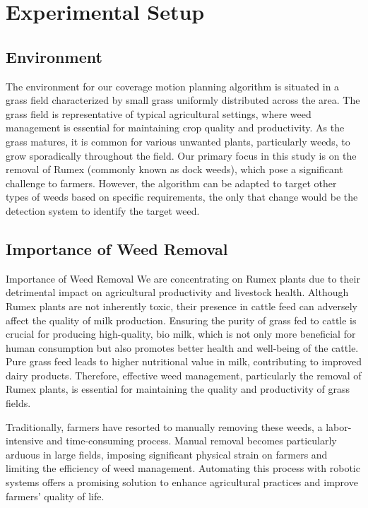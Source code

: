 \section{Experimental Setup}

\subsection{Environment}
The environment for our coverage motion planning algorithm is situated in a grass field characterized by small grass uniformly distributed across the area. The grass field is representative of typical agricultural settings, where weed management is essential for maintaining crop quality and productivity. As the grass matures, it is common for various unwanted plants, particularly weeds, to grow sporadically throughout the field. Our primary focus in this study is on the removal of Rumex (commonly known as dock weeds), which pose a significant challenge to farmers. However, the algorithm can be adapted to target other types of weeds based on specific requirements, the only that change would be the detection system to identify the target weed.

\subsection{Importance of Weed Removal}
Importance of Weed Removal
We are concentrating on Rumex plants due to their detrimental impact on agricultural productivity and livestock health. Although Rumex plants are not inherently toxic, their presence in cattle feed can adversely affect the quality of milk production. Ensuring the purity of grass fed to cattle is crucial for producing high-quality, bio milk, which is not only more beneficial for human consumption but also promotes better health and well-being of the cattle. Pure grass feed leads to higher nutritional value in milk, contributing to improved dairy products. Therefore, effective weed management, particularly the removal of Rumex plants, is essential for maintaining the quality and productivity of grass fields.


\vspace*{6mm}


Traditionally, farmers have resorted to manually removing these weeds, a labor-intensive and time-consuming process. Manual removal becomes particularly arduous in large fields, imposing significant physical strain on farmers and limiting the efficiency of weed management. Automating this process with robotic systems offers a promising solution to enhance agricultural practices and improve farmers' quality of life.

